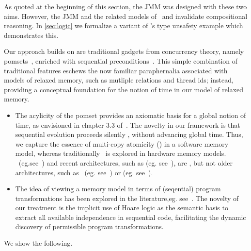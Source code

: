 As quoted at the beginning of this section, the JMM was designed with these two aims.  However, the JMM and the related models of~\citet{DBLP:conf/esop/JagadeesanPR10} and \citet{DBLP:conf/popl/KangHLVD17} invalidate compositional reasoning.  In \textsection\ref{sec:logic} we formalize a variant of \citeauthor{DBLP:journals/toplas/Lochbihler13}'s type unsafety example which demonstrates this.  

Our approach builds on are  traditional gadgets from concurrency theory, namely pomsets~\citep{Plotkin:1997:TSP:266557.266600}, enriched with sequential preconditions~\citep{Hoare:1969:ABC:363235.363259}.   This simple combination of traditional features eschews the now familiar paraphernalia associated with models of relaxed memory, such as  mutliple relations and thread ids; instead, providing a conceptual foundation for the notion of time in our model of relaxed memory.   

\begin{itemize}
\item The acylicity of the pomset provides an axiomatic basis for a global notion of time, as envisioned in chapter 3.3 of~\citet{AlglaveThesis}.  The  novelty in our framework is that sequential evolution  proceeds silently , without advancing global time.
Thus, we  capture the essence of multi-copy atomicity (\mca) in a software memory model, whereas traditionally \mca\ is explored in hardware memory models.   \tso\ (eg.see~\cite{DBLP:journals/cacm/SewellSONM10}) and recent architectures, such as \armeight (eg. see~\cite{DBLP:journals/pacmpl/PulteFDFSS18}), are \mca, but not older architectures, such as \ppc\ (eg. see~\cite{DBLP:conf/pldi/SarkarSAMW11}) or \armseven (eg. see~\cite{DBLP:conf/popl/AlglaveFIMSSN09}).

\item The idea of viewing a memory model in terms of (seqential) program transformations has been explored in the literature,eg. see~\citep{Saraswat:2007:TMM:1229428.1229469,DBLP:conf/fm/LahavV16,
DBLP:conf/popl/DemangeLZJPV13,DBLP:conf/esop/FerreiraFS10}.  The novelty of our treatment is the implicit use of Hoare logic as the semantic basis to extract all available independence in sequential code, facilitating the dynamic discovery of permissible program transformations.   
\end{itemize}


We show the following.


